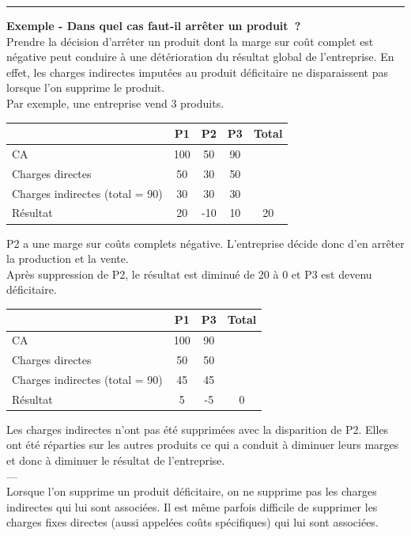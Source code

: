 \documentclass{kaobook}
\begin{document}
\noindent\rule{\textwidth}{0.5pt}
\textbf{Exemple - Dans quel cas faut-il arrêter un produit ?}\\
Prendre la décision d'arrêter un produit dont la marge sur coût complet est négative peut conduire à une détérioration du résultat global de l'entreprise. En effet, les charges indirectes imputées au produit déficitaire ne disparaissent pas lorsque l'on supprime le produit.\\

Par exemple, une entreprise vend 3 produits.\\
\begin{center}
\begin{tabular}{l c c c c}
 & P1 & P2 & P3 & Total\\
\hline
CA & 100 & 50 & 90 & \\
Charges directes & 50 & 30 & 50 & \\
Charges indirectes (total = 90) & 30 & 30 & 30 & \\
Résultat & 20 & -10 & 10 & 20\\
\end{tabular}
\end{center}

P2 a une marge sur coûts complets négative. L'entreprise décide donc d'en arrêter la production et la vente.\\

Après suppression de P2, le résultat est diminué de 20 à 0 et P3 est devenu déficitaire.\\
\begin{center}
\begin{tabular}{l c c c}
 & P1 & P3 & Total\\
\hline
CA & 100 & 90 & \\
Charges directes & 50 & 50 & \\
Charges indirectes (total = 90) & 45 & 45 & \\
Résultat & 5 & -5 & 0\\
\end{tabular}
\end{center}

Les charges indirectes n'ont pas été supprimées avec la disparition de P2. Elles ont été réparties sur les autres produits ce qui a conduit à diminuer leurs marges et donc à diminuer le résultat de l'entreprise.\\
---\\

Lorsque l'on supprime un produit déficitaire, on ne supprime pas les charges indirectes qui lui sont associées. Il est même parfois difficile de supprimer les charges fixes directes (aussi appelées coûts spécifiques) qui lui sont associées.\\
\end{document}
